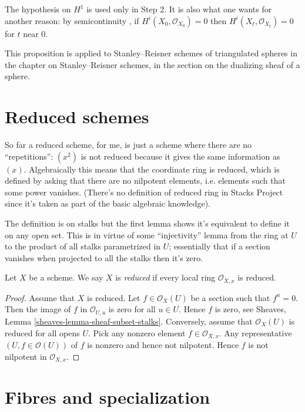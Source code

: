 The hypothesis on $H^1$ is used only in
Step 2. It is also what one wants for
another reason: by semicontinuity
\cite[III, Theorem 12.8]{har}, if
$H^i(X_0,\mathcal{O}_{X_0})=0$ then
$H^i(X_t,\mathcal{O}_{X_t})=0$ for $t$
near $0$.

This proposition is applied to
Stanley--Reisner schemes of triangulated
spheres in the chapter on
Stanley--Reisner schemes, in the section
on the dualizing sheaf of a sphere.

\section{Reduced schemes}
\label{section-reduced}

\noindent
So far a reduced scheme,
for me,
is just a scheme where there are
no ``repetitions'':
$(x^2)$ is not reduced because
it gives the same information as $(x)$.
Algebraically this means that the
coordinate ring is reduced,
which is defined by asking
that there are no nilpotent elements,
i.e. elements such that some power vanishes.
(There's no definition of reduced ring in
Stacks Project
since it's taken as part of the basic
algebraic knowledge).

The definition is on stalks but the first
lemma
shows it's equivalent to define it on any
open set.
This is in virtue of some ``injectivity''
lemma
from the ring at $U$ to the product of all
stalks parametrized in $U$;
essentially that if a section vanishes when
projected to all
the stalks then it's zero.

\begin{definition}
\label{definition-reduced}
Let $X$ be a scheme. We say $X$ is {\it
reduced} if every local ring
$\mathcal{O}_{X, x}$ is reduced.
\end{definition}


\begin{proof}
Assume that $X$ is reduced.
Let $f \in \mathcal{O}_X(U)$ be a section
such that $f^n = 0$.
Then the image of $f$ in $\mathcal{O}_{U, u}$
is zero for
all $u \in U$. Hence $f$ is zero, see
Sheaves, Lemma
\ref{sheaves-lemma-sheaf-subset-stalks}.
Conversely, assume that $\mathcal{O}_X(U)$ is
reduced
for all opens $U$. Pick any nonzero element
$f \in \mathcal{O}_{X, x}$.
Any representative $(U, f \in
\mathcal{O}(U))$  of $f$ is nonzero and
hence not nilpotent. Hence $f$ is not
nilpotent in $\mathcal{O}_{X, x}$.
\end{proof}

\section{Fibres and specialization}
\label{section-fibres-specialization}


